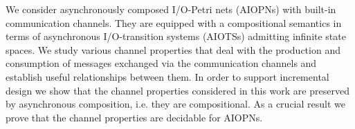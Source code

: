 
We consider asynchronously composed I/O-Petri nets (AIOPNs) with built-in communication channels.
They are equipped with a compositional semantics in terms of asynchronous I/O-transition systems (AIOTSs) admitting infinite state spaces.
We study various channel properties that deal with the production and consumption of messages exchanged via the communication channels and establish useful relationships between them. In order to support incremental design we show that the channel properties considered in this work are preserved by asynchronous composition, i.e. they are compositional. As a crucial result we prove that the channel properties are decidable for AIOPNs.    

